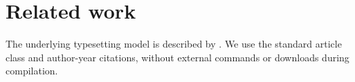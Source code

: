 \section{Related work}
The underlying typesetting model is described by \citet{knuth1984}.
We use the standard article class and author-year citations, without external
commands or downloads during compilation.

